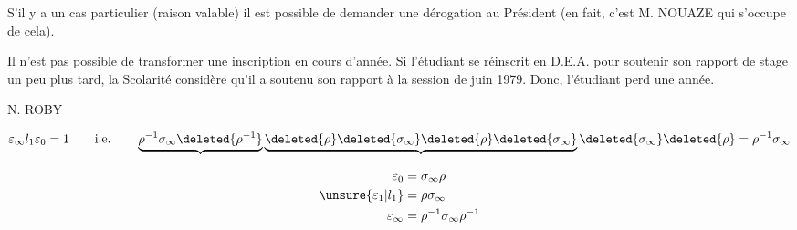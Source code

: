 S'il y a un cas particulier (raison valable) il est possible de demander une dérogation au Président (en fait, c'est M. NOUAZE qui s'occupe de cela).

Il n'est pas possible de transformer une inscription en cours d'année. Si l'étudiant se réinscrit en D.E.A. pour soutenir son rapport de stage un peu plus tard, la Scolarité considère qu'il a soutenu son rapport à la session de juin 1979. Donc, l'étudiant perd une année.

\begin{flushright}
N. ROBY
\end{flushright}




\[
\varepsilon_\infty l_1\varepsilon_0=1
\qquad\text{i.e.}\qquad
\underbrace{\rho^{-1}\sigma_\infty\deleted{\rho^{-1}}}
\underbrace{\deleted{\rho}\deleted{\sigma_\infty}
\deleted{\rho}\deleted{\sigma_\infty}}
\deleted{\sigma_\infty}\deleted{\rho}
=\rho^{-1}\sigma_\infty
\]

\[
\begin{aligned}
\varepsilon_0&=\sigma_\infty\rho\\
\unsure{\varepsilon_1|l_1}&=\rho\sigma_\infty\\
\varepsilon_\infty&=\rho^{-1}\sigma_\infty\rho^{-1}
\end{aligned}
\]


